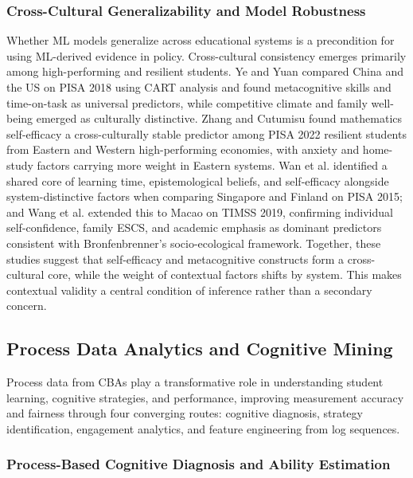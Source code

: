 \documentclass{ieeeaccess}
\begin{document}
\subsubsection{Cross-Cultural Generalizability and Model Robustness}\label{subsubsec4.1.5}

Whether ML models generalize across educational systems is a precondition for using ML-derived evidence in policy. Cross-cultural consistency emerges primarily among high-performing and resilient students. Ye and Yuan \cite{ye-yuan2022} compared China and the US on PISA 2018 using CART analysis and found metacognitive skills and time-on-task as universal predictors, while competitive climate and family well-being emerged as culturally distinctive. Zhang and Cutumisu \cite{zhang-cutumisu2024} found mathematics self-efficacy a cross-culturally stable predictor among PISA 2022 resilient students from Eastern and Western high-performing economies, with anxiety and home-study factors carrying more weight in Eastern systems. Wan et al. \cite{wan-etal2025} identified a shared core of learning time, epistemological beliefs, and self-efficacy alongside system-distinctive factors when comparing Singapore and Finland on PISA 2015; and Wang et al. \cite{wang-king-haw-leung2022} extended this to Macao on TIMSS 2019, confirming individual self-confidence, family ESCS, and academic emphasis as dominant predictors consistent with Bronfenbrenner's socio-ecological framework. Together, these studies suggest that self-efficacy and metacognitive constructs form a cross-cultural core, while the weight of contextual factors shifts by system. This makes contextual validity a central condition of inference rather than a secondary concern.

\subsection{Process Data Analytics and Cognitive Mining}\label{subsec4.2}

Process data from CBAs play a transformative role in understanding student learning, cognitive strategies, and performance, improving measurement accuracy and fairness through four converging routes: cognitive diagnosis, strategy identification, engagement analytics, and feature engineering from log sequences.

\subsubsection{Process-Based Cognitive Diagnosis and Ability Estimation}\label{subsubsec4.2.1}
\end{document}
